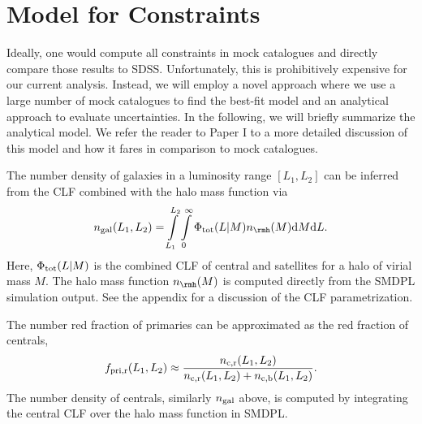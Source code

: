 \documentclass[fleqn,usenatbib,useAMS]{mnras}
\begin{document}
\section{Model for Constraints}
\label{sec:model}

Ideally, one would compute all constraints in mock catalogues and directly compare those results to SDSS. Unfortunately, this is prohibitively expensive for our current analysis. Instead, we will employ a novel approach where we use a large number of mock catalogues to find the best-fit model and an analytical approach to evaluate uncertainties. In the following, we will briefly summarize the analytical model. We refer the reader to Paper I to a more detailed discussion of this model and how it fares in comparison to mock catalogues.

The number density of galaxies in a luminosity range $[L_1, L_2]$ can be inferred from the CLF combined with the halo mass function via
\begin{equation}
n_{\rm gal}(L_1, L_2) = \int\limits_{L_1}^{L_2} \int\limits_0^\infty \Phi_{\rm tot}(L | M) n_\rmh (M) \mathrm{d}M \mathrm{d}L.
\end{equation}
Here, $\Phi_{\rm tot}(L | M)$ is the combined CLF of central and satellites for a halo of virial mass $M$. The halo mass function $n_\rmh (M)$ is computed directly from the SMDPL simulation output. See the appendix for a discussion of the CLF parametrization.

The number red fraction of primaries can be approximated as the red fraction of centrals,
\begin{equation}
f_{\rm pri, r} (L_1, L_2) \approx \frac{n_{\rm c, r} (L_1, L_2)}{n_{\rm c, r} (L_1, L_2) + n_{\rm c, b} (L_1, L_2)}.
\end{equation}
The number density of centrals, similarly $n_{\rm gal}$ above, is computed by integrating the central CLF over the halo mass function in SMDPL.
\end{document}
